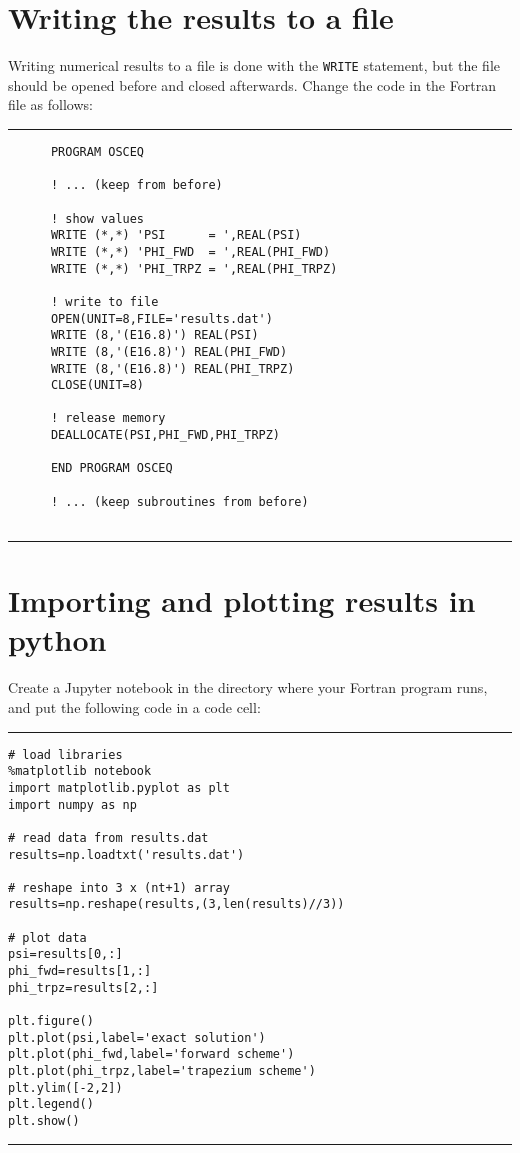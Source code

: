 \documentclass[a4paper]{article}
\begin{document}
\section{Writing the results to a file}
%
\par
Writing numerical results to a file is done with the \texttt{WRITE} statement, but the file should be opened before and closed afterwards. Change the code in the Fortran file as follows:
%
{\vspace{10pt}\hrule\small\vspace*{-2pt}\begin{verbatim}
	  PROGRAM OSCEQ
	  
	  ! ... (keep from before)
	  
	  ! show values
	  WRITE (*,*) 'PSI      = ',REAL(PSI)
	  WRITE (*,*) 'PHI_FWD  = ',REAL(PHI_FWD)
	  WRITE (*,*) 'PHI_TRPZ = ',REAL(PHI_TRPZ)
	  
	  ! write to file
	  OPEN(UNIT=8,FILE='results.dat')
	  WRITE (8,'(E16.8)') REAL(PSI)
	  WRITE (8,'(E16.8)') REAL(PHI_FWD)
	  WRITE (8,'(E16.8)') REAL(PHI_TRPZ)
	  CLOSE(UNIT=8)

	  ! release memory
	  DEALLOCATE(PSI,PHI_FWD,PHI_TRPZ)

	  END PROGRAM OSCEQ

      ! ... (keep subroutines from before)
	  
\end{verbatim}\hrule\vspace{5pt}}
%
\section{Importing and plotting results in python}
%
\par
Create a Jupyter notebook in the directory where your Fortran program runs, and put the following code in a code cell:
{\vspace{10pt}\hrule\small\vspace*{-2pt}\begin{verbatim}
# load libraries
%matplotlib notebook
import matplotlib.pyplot as plt
import numpy as np

# read data from results.dat
results=np.loadtxt('results.dat')

# reshape into 3 x (nt+1) array
results=np.reshape(results,(3,len(results)//3))

# plot data
psi=results[0,:]
phi_fwd=results[1,:]
phi_trpz=results[2,:]

plt.figure()
plt.plot(psi,label='exact solution')
plt.plot(phi_fwd,label='forward scheme')
plt.plot(phi_trpz,label='trapezium scheme')
plt.ylim([-2,2])
plt.legend()
plt.show()	  
\end{verbatim}\hrule\vspace{5pt}}
%
\end{document}
